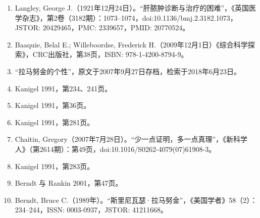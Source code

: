 \begin{enumerate}
\item Langley, George J.（1921年12月24日）。“肝脓肿诊断与治疗的困难”，《英国医学杂志》，第2卷（3182期）：1073–1074，doi:10.1136/bmj.2.3182.1073，JSTOR: 20429465，PMC: 2339657，PMID: 20770524。
\item Baaquie, Belal E.; Willeboordse, Frederick H.（2009年12月1日）《综合科学探索》，CRC出版社，第38页，ISBN: 978-1-4200-8794-9。
\item “拉马努金的个性”，原文于2007年9月27日存档，检索于2018年6月23日。
\item Kanigel 1991，第234、241页。
\item Kanigel 1991，第36页。
\item Kanigel 1991，第281页。
\item Chaitin, Gregory（2007年7月28日）。“少一点证明，多一点真理”，《新科学人》（第2614期）：第49页，doi:10.1016/S0262-4079(07)61908-3。
\item Kanigel 1991，第283页。
\item Berndt 与 Rankin 2001，第47页。
\item Berndt, Bruce C.（1989年）。“斯里尼瓦瑟·拉马努金”，《美国学者》58（2）：234–244，ISSN: 0003-0937，JSTOR: 41211668。
\end{enumerate}
